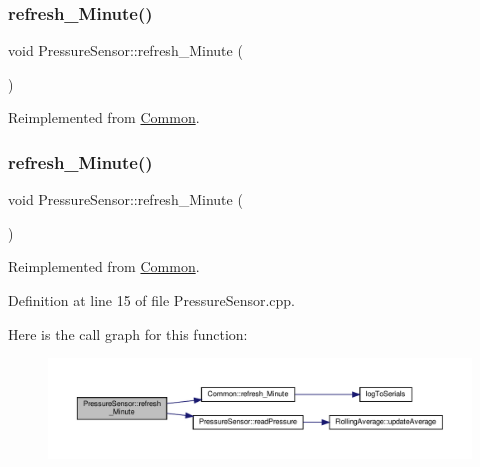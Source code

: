\subsubsection{\texorpdfstring{refresh\+\_\+\+Minute()}{refresh\_Minute()}\hspace{0.1cm}{\footnotesize\ttfamily [1/2]}}
{\footnotesize\ttfamily void Pressure\+Sensor\+::refresh\+\_\+\+Minute (\begin{DoxyParamCaption}{ }\end{DoxyParamCaption})\hspace{0.3cm}{\ttfamily [virtual]}}



Reimplemented from \hyperlink{class_common_a14e4462a94bd118028ce1d487ca0292c}{Common}.

\mbox{\label{class_pressure_sensor_a1081c5a1073a4c5d0c790f92e53febf0}} 
\subsubsection{\texorpdfstring{refresh\+\_\+\+Minute()}{refresh\_Minute()}\hspace{0.1cm}{\footnotesize\ttfamily [2/2]}}
{\footnotesize\ttfamily void Pressure\+Sensor\+::refresh\+\_\+\+Minute (\begin{DoxyParamCaption}{ }\end{DoxyParamCaption})\hspace{0.3cm}{\ttfamily [virtual]}}



Reimplemented from \hyperlink{class_common_a14e4462a94bd118028ce1d487ca0292c}{Common}.



Definition at line 15 of file Pressure\+Sensor.\+cpp.

Here is the call graph for this function\+:
\nopagebreak
\begin{figure}[H]
\begin{center}
\leavevmode
\includegraphics[width=350pt]{class_pressure_sensor_a1081c5a1073a4c5d0c790f92e53febf0_cgraph}
\end{center}
\end{figure}
\mbox{\label{class_pressure_sensor_ae9f360e068bc30f611ba50c7c9cf7e4a}} 
